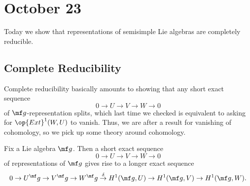 \documentclass[../notes.tex]{subfiles}
\begin{document}
\section{October 23}
Today we show that representations of semisimple Lie algebras are completely reducible.

\subsection{Complete Reducibility}
Complete reducibility basically amounts to showing that any short exact sequence
\[0\to U\to V\to W\to0\]
of $\mf g$-representation splits, which last time we checked is equivalent to asking for $\op{Ext}^1(W,U)$ to vanish. Thus, we are after a result for vanishing of cohomology, so we pick up some theory around cohomology.
\begin{lemma} \label{lem:les-h1}
	Fix a Lie algebra $\mf g$. Then a short exact sequence
	\[0\to U\to V\to W\to0\]
	of representations of $\mf g$ gives rise to a longer exact sequence
	\[0\to U^\mf g\to V^\mf g\to W^\mf g\stackrel\delta\to H^1(\mf g,U)\to H^1(\mf g,V)\to H^1(\mf g,W).\]
\end{lemma}
\end{document}
